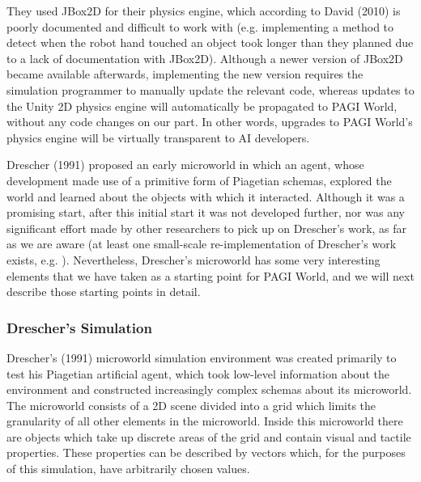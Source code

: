 
They used JBox2D for their physics engine, which according to David (2010) is poorly documented and difficult to work with (e.g. implementing a method to detect when the robot hand touched an object took longer than they planned due to a lack of documentation with JBox2D). Although a newer version of JBox2D became available afterwards, implementing the new version requires the simulation programmer to manually update the relevant code, whereas updates to the Unity 2D physics engine will automatically be propagated to PAGI World, without any code changes on our part. In other words, upgrades to PAGI World's physics engine will be virtually transparent to AI developers.


Drescher (1991)\nocite{Drescher1991} proposed an early microworld in which an agent, whose development made use of a primitive form of Piagetian schemas, explored the world and learned about the objects with which it interacted. Although it was a promising start, after this initial start it was not developed further, nor was any significant effort made by other researchers to pick up on Drescher's work, as far as we are aware (at least one small-scale re-implementation of Drescher's work exists, e.g. \cite{Chaput2003}). Nevertheless, Drescher's microworld has some very interesting elements that we have taken as a starting point for PAGI World, and we will next describe those starting points in detail.

\subsubsection{Drescher's Simulation}

Drescher's (1991) microworld simulation environment was created primarily to test his Piagetian artificial agent, which took low-level information about the environment and constructed increasingly complex schemas about its microworld. The microworld consists of a 2D scene divided into a grid which limits the granularity of all other elements in the microworld. Inside this microworld there are objects which take up discrete areas of the grid and contain visual and tactile properties. These properties can be described by vectors which, for the purposes of this simulation, have arbitrarily chosen values.

